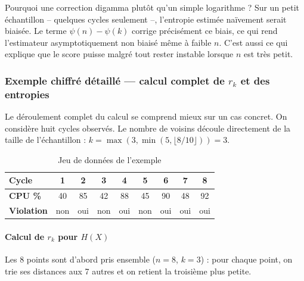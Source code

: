 Pourquoi une correction digamma plutôt qu'un simple logarithme ? Sur un petit échantillon -- quelques cycles seulement --, l'entropie estimée naïvement serait biaisée. Le terme $\psi(n) - \psi(k)$ corrige précisément ce biais, ce qui rend l'estimateur asymptotiquement non biaisé même à faible $n$. C'est aussi ce qui explique que le score puisse malgré tout rester instable lorsque $n$ est très petit.

\subsubsection{Exemple chiffré détaillé — calcul complet de $r_k$ et des entropies}

Le déroulement complet du calcul se comprend mieux sur un cas concret. On considère huit cycles observés. Le nombre de voisins découle directement de la taille de l'échantillon : $k = \max(3, \min(5, \lfloor 8/10 \rfloor)) = 3$.

\begin{table}[H]
    \centering
    \label{tab:mi-donnees}
    \begin{tabular}{|l|c|c|c|c|c|c|c|c|}
        \hline
        \textbf{Cycle} & 1 & 2 & 3 & 4 & 5 & 6 & 7 & 8 \\
        \hline
        \textbf{CPU \%} & 40 & 85 & 42 & 88 & 45 & 90 & 48 & 92 \\
        \hline
        \textbf{Violation} & non & oui & non & oui & non & oui & oui & oui \\
        \hline
    \end{tabular}
    \caption{Jeu de données de l'exemple}

\end{table}

\paragraph{Calcul de $r_k$ pour $H(X)$}

Les 8 points sont d'abord pris ensemble ($n = 8$, $k = 3$) : pour chaque point, on trie ses distances aux 7 autres et on retient la troisième plus petite.

